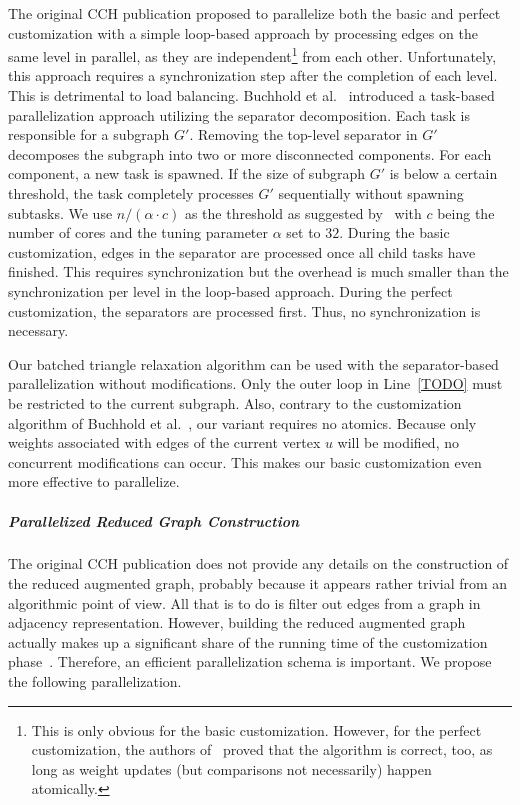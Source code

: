 \documentclass[a4paper, english, cleveref]{lipics-v2021}
\begin{document}
The original CCH publication proposed to parallelize both the basic and perfect customization with a simple loop-based approach by processing edges on the same level in parallel, as they are independent\footnote{
This is only obvious for the basic customization.
However, for the perfect customization, the authors of~\cite{DibbeltSW16} proved that the algorithm is correct, too, as long as weight updates (but comparisons not necessarily) happen atomically.
} from each other.
Unfortunately, this approach requires a synchronization step after the completion of each level.
This is detrimental to load balancing.
Buchhold et al.~\cite{BuchholdSW19} introduced a task-based parallelization approach utilizing the separator decomposition.
Each task is responsible for a subgraph $G'$.
Removing the top-level separator in $G'$ decomposes the subgraph into two or more disconnected components.
For each component, a new task is spawned.
If the size of subgraph $G'$ is below a certain threshold, the task completely processes $G'$ sequentially without spawning subtasks.
We use $n/(\alpha \cdot c)$ as the threshold as suggested by~\cite{BuchholdSW19} with $c$ being the number of cores and the tuning parameter $\alpha$ set to $32$.
During the basic customization, edges in the separator are processed once all child tasks have finished.
This requires synchronization but the overhead is much smaller than the synchronization per level in the loop-based approach.
During the perfect customization, the separators are processed first.
Thus, no synchronization is necessary.

Our batched triangle relaxation algorithm can be used with the separator-based parallelization without modifications.
Only the outer loop in Line~\ref{TODO} must be restricted to the current subgraph.
Also, contrary to the customization algorithm of Buchhold et al.~\cite{BuchholdSW19}, our variant requires no atomics.
Because only weights associated with edges of the current vertex $u$ will be modified, no concurrent modifications can occur.
This makes our basic customization even more effective to parallelize.

\subparagraph{Parallelized Reduced Graph Construction}

The original CCH publication does not provide any details on the construction of the reduced augmented graph, probably because it appears rather trivial from an algorithmic point of view.
All that is to do is filter out edges from a graph in adjacency representation.
However, building the reduced augmented graph actually makes up a significant share of the running time of the customization phase~\cite{BuchholdSW19}.
Therefore, an efficient parallelization schema is important.
We propose the following parallelization.
\end{document}
